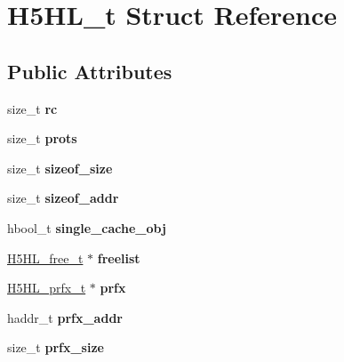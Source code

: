 \hypertarget{struct_h5_h_l__t}{}\section{H5\+H\+L\+\_\+t Struct Reference}
\label{struct_h5_h_l__t}
\subsection*{Public Attributes}
\begin{DoxyCompactItemize}
\item 
\mbox{\label{struct_h5_h_l__t_a77f785fb3cbc70061a8543a916e96786}} 
size\+\_\+t {\bfseries rc}
\item 
\mbox{\label{struct_h5_h_l__t_a1b7d5a7dfef50757c87886c6c8f3b591}} 
size\+\_\+t {\bfseries prots}
\item 
\mbox{\label{struct_h5_h_l__t_a8ee2adb4ea17a38be51ee8c56ec70b57}} 
size\+\_\+t {\bfseries sizeof\+\_\+size}
\item 
\mbox{\label{struct_h5_h_l__t_aaa16448c69ad2c033dd4bed65f10ab1a}} 
size\+\_\+t {\bfseries sizeof\+\_\+addr}
\item 
\mbox{\label{struct_h5_h_l__t_a5f9858012ff5fa7403462a3e1ae83254}} 
hbool\+\_\+t {\bfseries single\+\_\+cache\+\_\+obj}
\item 
\mbox{\label{struct_h5_h_l__t_acc2288d107ab8d3fca0e52d933ae04f3}} 
\hyperlink{struct_h5_h_l__free__t}{H5\+H\+L\+\_\+free\+\_\+t} $\ast$ {\bfseries freelist}
\item 
\mbox{\label{struct_h5_h_l__t_a22a15adfc0e7bb7d40f07a5fc2de3541}} 
\hyperlink{struct_h5_h_l__prfx__t}{H5\+H\+L\+\_\+prfx\+\_\+t} $\ast$ {\bfseries prfx}
\item 
\mbox{\label{struct_h5_h_l__t_a995be0858b5e2678d4edc7846b5e670e}} 
haddr\+\_\+t {\bfseries prfx\+\_\+addr}
\item 
\mbox{\label{struct_h5_h_l__t_a32bd4aff3658299b50568fef64d5f192}} 
size\+\_\+t {\bfseries prfx\+\_\+size}

\end{DoxyCompactItemize}
